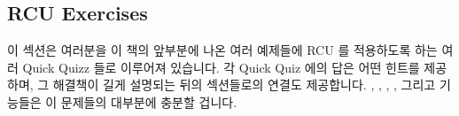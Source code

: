 
\subsection{RCU Exercises}
\label{sec:defer:RCU Exercises}

이 섹션은 여러분을 이 책의 앞부분에 나온 여러 예제들에 RCU 를 적용하도록 하는
여러 Quick Quizz 들로 이루어져 있습니다.
각 Quick Quiz 에의 답은 어떤 힌트를 제공하며, 그 해결책이 길게 설명되는 뒤의
섹션들로의 연결도 제공합니다.
, , ,
, 그리고  기능들은 이 문제들의
대부분에 충분할 겁니다.

\iffalse

This section is organized as a series of Quick Quizzes that invite you
to apply RCU to a number of examples earlier in this book.
The answer to each Quick Quiz gives some hints, and also contains a
pointer to a later section where the solution is explained at length.
The \co{rcu_read_lock()}, \co{rcu_read_unlock()}, \co{rcu_dereference()},
\co{rcu_assign_pointer()}, and \co{synchronize_rcu()} primitives should
suffice for most of these exercises.

\fi

